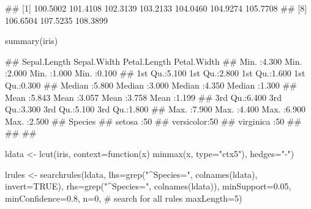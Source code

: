 \documentclass{article}\usepackage[]{graphicx}\usepackage[]{color}
\begin{document}
\begin{Schunk}
% --begin: "frbe"
\begin{Soutput}
##  [1] 100.5002 101.4108 102.3139 103.2133 104.0460 104.9274 105.7708
##  [8] 106.6504 107.5235 108.3899
\end{Soutput}
%
% --end: "frbe"
\end{Schunk}

\begin{Schunk}
% --begin: "casestudy-assoc-iris"
\begin{Sinput}
summary(iris)
\end{Sinput}
\begin{Soutput}
##   Sepal.Length    Sepal.Width     Petal.Length    Petal.Width   
##  Min.   :4.300   Min.   :2.000   Min.   :1.000   Min.   :0.100  
##  1st Qu.:5.100   1st Qu.:2.800   1st Qu.:1.600   1st Qu.:0.300  
##  Median :5.800   Median :3.000   Median :4.350   Median :1.300  
##  Mean   :5.843   Mean   :3.057   Mean   :3.758   Mean   :1.199  
##  3rd Qu.:6.400   3rd Qu.:3.300   3rd Qu.:5.100   3rd Qu.:1.800  
##  Max.   :7.900   Max.   :4.400   Max.   :6.900   Max.   :2.500  
##        Species  
##  setosa    :50  
##  versicolor:50  
##  virginica :50  
##                 
##                 
## 
\end{Soutput}
%
% --end: "casestudy-assoc-iris"
\end{Schunk}

\begin{Schunk}
% --begin: "casestudy-assoc-lcut"
\begin{Sinput}
ldata <- lcut(iris,
              context=function(x) minmax(x, type="ctx5"),
              hedges="-")
\end{Sinput}
%
% --end: "casestudy-assoc-lcut"
\end{Schunk}

\begin{Schunk}
% --begin: "casestudy-assoc-searchrules"
\begin{Sinput}
lrules <- searchrules(ldata,
                      lhs=grep("^Species=", colnames(ldata), invert=TRUE),
                      rhs=grep("^Species=", colnames(ldata)),
                      minSupport=0.05,
                      minConfidence=0.8,
                      n=0,                         # search for all rules
                      maxLength=5)
\end{Sinput}
%
% --end: "casestudy-assoc-searchrules"
\end{Schunk}
\end{document}
